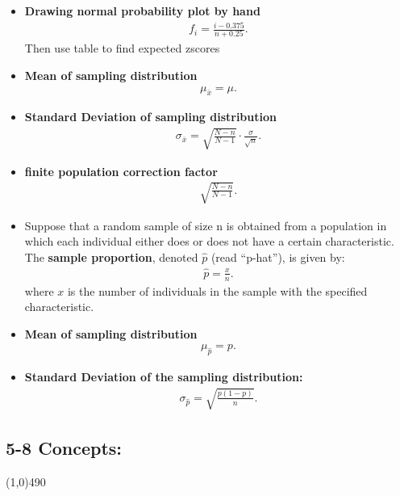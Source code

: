 \documentclass{report}
\begin{document}
\begin{itemize}
              \item \textbf{Drawing normal probability plot by hand}
                \begin{align*}
                  f_{i} = \frac{i - 0.375}{n + 0.25}
                .\end{align*}
                Then use table to find expected zscores
                        \item \textbf{Mean of sampling distribution}
            \begin{align*}
                \mu_{\overline{x}} = \mu
            .\end{align*}
        \item \textbf{Standard Deviation of sampling distribution}
            \begin{align*}
                \sigma_{\overline{x}} = \sqrt{\frac{N-n}{N-1}} \cdot \frac{\sigma}{\sqrt{n}}
            .\end{align*}
        \item \textbf{finite population correction factor}
            \begin{align*}
                \sqrt{\frac{N-n}{N-1}}
            .\end{align*}
                     \item Suppose that a random sample of size n is obtained from a population in which each individual either does or does not have a certain characteristic. The \textbf{sample proportion}, denoted $\hat{p}$ (read “p-hat”), is given by:
             \begin{align*}
                 \hat{p} = \frac{x}{n}
             .\end{align*}
            where $x $ is the number of individuals in the sample with the specified characteristic. 
        \item \textbf{Mean of sampling distribution}
            \begin{align*}
                \mu_{\hat{p}} = p
            .\end{align*}
        \item \textbf{Standard Deviation of the sampling distribution:}
            \begin{align*}
               \sigma_{\hat{p}} = \sqrt{\frac{p(1-p)}{n}} 
            .\end{align*}     
    \end{itemize}


    \pagebreak 
    \begin{center}
      \subsection*{5-8 Concepts:}
    \end{center}
    \line(1,0){490}
    \bigbreak \noindent
\end{document}
